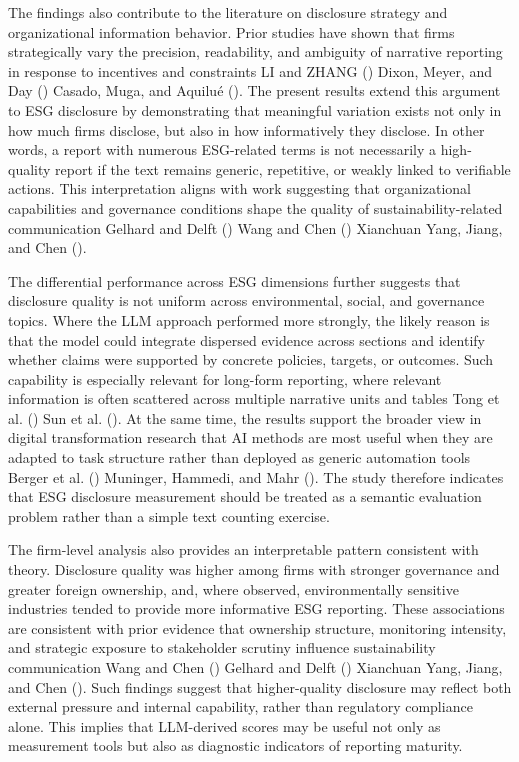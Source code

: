 \documentclass[
  12pt,
]{article}
\begin{document}
The findings also contribute to the literature on disclosure strategy
and organizational information behavior. Prior studies have shown that
firms strategically vary the precision, readability, and ambiguity of
narrative reporting in response to incentives and constraints LI and
ZHANG () Dixon, Meyer, and Day
() Casado, Muga, and Aquilué
(). The present results extend this
argument to ESG disclosure by demonstrating that meaningful variation
exists not only in how much firms disclose, but also in how
informatively they disclose. In other words, a report with numerous
ESG-related terms is not necessarily a high-quality report if the text
remains generic, repetitive, or weakly linked to verifiable actions.
This interpretation aligns with work suggesting that organizational
capabilities and governance conditions shape the quality of
sustainability-related communication Gelhard and Delft
() Wang and Chen
() Xianchuan Yang, Jiang, and Chen
().

The differential performance across ESG dimensions further suggests that
disclosure quality is not uniform across environmental, social, and
governance topics. Where the LLM approach performed more strongly, the
likely reason is that the model could integrate dispersed evidence
across sections and identify whether claims were supported by concrete
policies, targets, or outcomes. Such capability is especially relevant
for long-form reporting, where relevant information is often scattered
across multiple narrative units and tables Tong et al.
() Sun et al.
(). At the same time, the results support
the broader view in digital transformation research that AI methods are
most useful when they are adapted to task structure rather than deployed
as generic automation tools Berger et al.
() Muninger, Hammedi, and Mahr
(). The study therefore indicates that
ESG disclosure measurement should be treated as a semantic evaluation
problem rather than a simple text counting exercise.

The firm-level analysis also provides an interpretable pattern
consistent with theory. Disclosure quality was higher among firms with
stronger governance and greater foreign ownership, and, where observed,
environmentally sensitive industries tended to provide more informative
ESG reporting. These associations are consistent with prior evidence
that ownership structure, monitoring intensity, and strategic exposure
to stakeholder scrutiny influence sustainability communication Wang and
Chen () Gelhard and Delft
() Xianchuan Yang, Jiang, and Chen
(). Such findings suggest that
higher-quality disclosure may reflect both external pressure and
internal capability, rather than regulatory compliance alone. This
implies that LLM-derived scores may be useful not only as measurement
tools but also as diagnostic indicators of reporting maturity.
\end{document}
